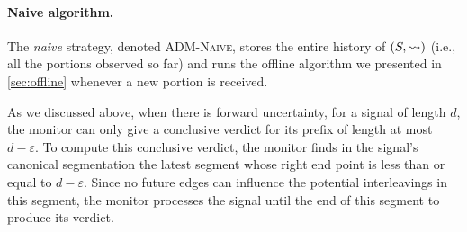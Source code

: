 \paragraph*{Naive algorithm.}
The \emph{naive} strategy, denoted \textsc{ADM-Naive}, stores the entire history of $(S,{\rightsquigarrow})$ (i.e., all the portions observed so far) and runs the offline algorithm we presented in \cref{sec:offline} whenever a new portion is received.

As we discussed above, when there is forward uncertainty, for a signal of length $d$, the monitor can only give a conclusive verdict for its prefix of length at most $d-\varepsilon$.
To compute this conclusive verdict, the monitor finds in the signal's canonical segmentation the latest segment whose right end point is less than or equal to $d-\varepsilon$.
Since no future edges can influence the potential interleavings in this segment, the monitor processes the signal until the end of this segment to produce its verdict.


